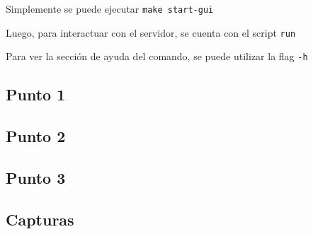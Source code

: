 \documentclass[12pt,journal,compsoc]{IEEEtran}
\begin{document}
Simplemente se puede ejecutar \texttt{make start-gui}

Luego, para interactuar con el servidor, se cuenta con el script \texttt{run}

Para ver la sección de ayuda del comando, se puede utilizar la flag \texttt{-h}

\newpage
\onecolumn
{}
\label{appendix:codigo-java}

\subsection{Punto 1}
\label{section:code-punto1}


\subsection{Punto 2}
\label{section:code-punto2}


\subsection{Punto 3}
\label{section:code-punto3}


\newpage
\subsection{Capturas}
\end{document}
